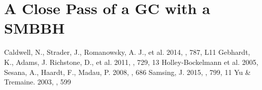 \documentclass{aastex62}
\begin{document}
\section{A Close Pass of a GC with a SMBBH}

\begin{thebibliography}{}
Caldwell, N., Strader, J., Romanowsky, A. J., et al. 2014, \apjl, 787, L11
Gebhardt, K., Adams, J. Richstone, D., et al. 2011, \apj, 729, 13
Holley-Bockelmann et al. 2005, \apjl
{}
Sesana, A., Haardt, F., Madau, P. 2008, \apj, 686
Samsing, J. 2015, \apj, 799, 11
Yu \& Tremaine. 2003, \apj, 599
\end{thebibliography}
\end{document}
